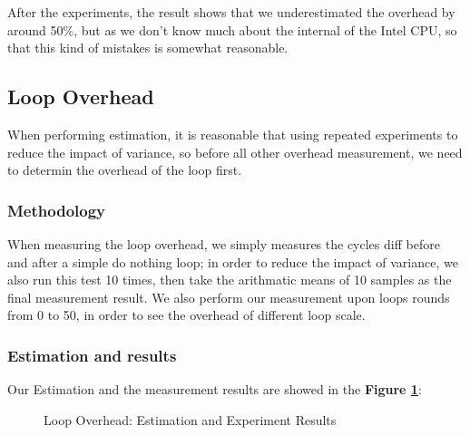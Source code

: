 After the experiments, the result shows that we underestimated the overhead by around 50\%, but as we don't know much about the internal of the Intel CPU, so that this kind of mistakes is somewhat reasonable.

\subsection{Loop Overhead}
When performing estimation, it is reasonable that using repeated experiments to reduce the impact of variance, so before all other overhead measurement, we need to determin the overhead of the loop first.

\subsubsection{Methodology}

When measuring the loop overhead, we simply measures the cycles diff before and after a simple do nothing loop; in order to reduce the impact of variance, we also run this test 10 times, then take the arithmatic
means of 10 samples as the final measurement result. We also perform our measurement upon loops rounds from 0 to 50, in order to see the overhead of different loop scale.

\subsubsection{Estimation and results}

Our Estimation and the measurement results are showed in the \textbf{Figure \ref{loop_overhead_result}}:

\begin{figure}[ht]
    \centering
    \caption{Loop Overhead: Estimation and Experiment Results }
    \label{loop_overhead_result}
\end{figure}

